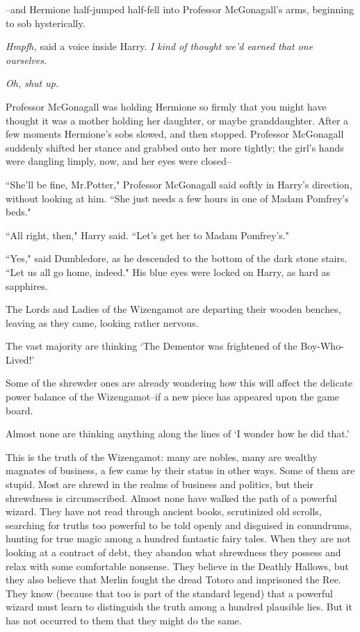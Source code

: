 \---and Hermione half-jumped half-fell into Professor McGonagall's arms, beginning to sob hysterically.

\emph{Hmpfh,} said a voice inside Harry. \emph{I kind of thought we'd earned that one ourselves.}

\emph{Oh, shut up.}

Professor McGonagall was holding Hermione so firmly that you might have thought it was a mother holding her daughter, or maybe granddaughter. After a few moments Hermione's sobs slowed, and then stopped. Professor McGonagall suddenly shifted her stance and grabbed onto her more tightly; the girl's hands were dangling limply, now, and her eyes were closed\---

``She'll be fine, Mr.\?Potter," Professor McGonagall said softly in Harry's direction, without looking at him. ``She just needs a few hours in one of Madam Pomfrey's beds."

``All right, then," Harry said. ``Let's get her to Madam Pomfrey's."

``Yes," said Dumbledore, as he descended to the bottom of the dark stone stairs. ``Let us all go home, indeed." His blue eyes were locked on Harry, as hard as sapphires.

\later

The Lords and Ladies of the Wizengamot are departing their wooden benches, leaving as they came, looking rather nervous.

The vast majority are thinking `The Dementor was frightened of the Boy-Who-Lived!'

Some of the shrewder ones are already wondering how this will affect the delicate power balance of the Wizengamot\---if a new piece has appeared upon the game board.

Almost none are thinking anything along the lines of `I wonder how he did that.'

This is the truth of the Wizengamot: many are nobles, many are wealthy magnates of business, a few came by their status in other ways. Some of them are stupid. Most are shrewd in the realms of business and politics, but their shrewdness is circumscribed. Almost none have walked the path of a powerful wizard. They have not read through ancient books, scrutinized old scrolls, searching for truths too powerful to be told openly and disguised in conundrums, hunting for true magic among a hundred fantastic fairy tales. When they are not looking at a contract of debt, they abandon what shrewdness they possess and relax with some comfortable nonsense. They believe in the Deathly Hallows, but they also believe that Merlin fought the dread Totoro and imprisoned the Ree. They know (because that too is part of the standard legend) that a powerful wizard must learn to distinguish the truth among a hundred plausible lies. But it has not occurred to them that they might do the same.

